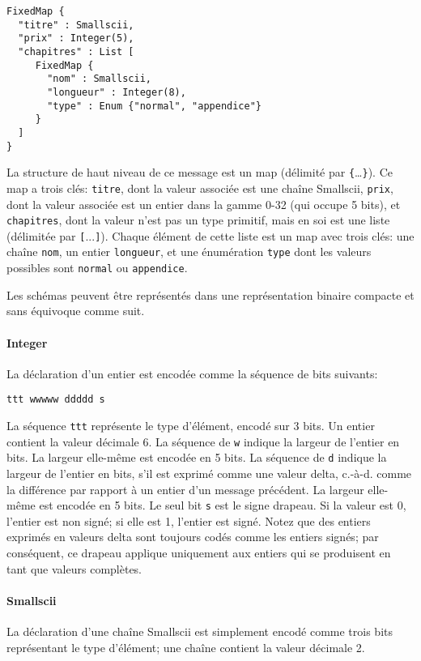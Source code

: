 \begin{verbatim}
FixedMap {
  "titre" : Smallscii,
  "prix" : Integer(5),
  "chapitres" : List [
     FixedMap {
       "nom" : Smallscii,
       "longueur" : Integer(8),
       "type" : Enum {"normal", "appendice"}
     }
  ]
}
\end{verbatim}

La structure de haut niveau de ce message est un map (délimité par \verb+{+\dots\verb+}+). Ce map a trois clés: \verb+titre+, dont la valeur associée est une chaîne Smallscii, \verb+prix+, dont la valeur associée est un entier dans la gamme 0-32 (qui occupe 5 bits), et \verb+chapitres+, dont la valeur n'est pas un type primitif, mais en soi est une liste (délimitée par \verb+[+...\verb+]+). Chaque élément de cette liste est un map avec trois clés: une chaîne \verb+nom+, un entier \verb+longueur+, et une énumération \verb+type+ dont les valeurs possibles sont \verb+normal+ ou \verb+appendice+.

Les schémas peuvent être représentés dans une représentation binaire compacte et sans équivoque comme suit.

\paragraph{Integer} La déclaration d'un entier est encodée comme la séquence de bits suivants:
%
\begin{verbatim}
ttt wwwww ddddd s
\end{verbatim}

La séquence \verb+ttt+ représente le type d'élément, encodé sur 3 bits. Un entier contient la valeur décimale 6. La séquence de \verb+w+ indique la largeur de l'entier en bits. La largeur elle-même est encodée en 5 bits. La séquence de \verb+d+ indique la largeur de l'entier en bits, s'il est exprimé comme une valeur delta, c.-à-d. comme la différence par rapport à un entier d'un message précédent. La largeur elle-même est encodée en 5 bits. Le seul bit \verb+s+ est le signe drapeau. Si la valeur est 0, l'entier est non signé; si elle est 1, l'entier est signé. Notez que des entiers exprimés en valeurs delta sont toujours codés comme les entiers signés; par conséquent, ce drapeau applique uniquement aux entiers qui se produisent en tant que valeurs complètes.

\paragraph{Smallscii} La déclaration d'une chaîne Smallscii est simplement encodé comme trois bits représentant le type d'élément; une chaîne contient la valeur décimale 2.

